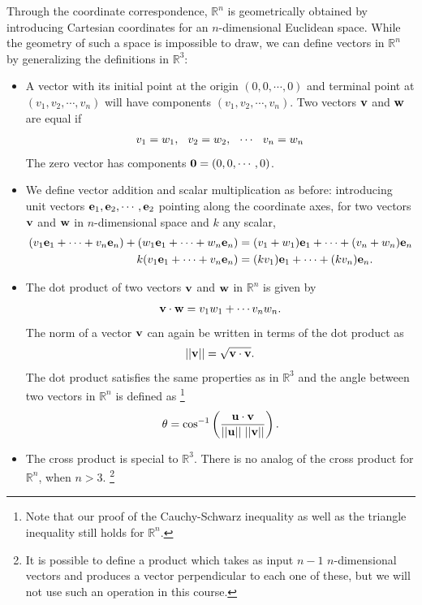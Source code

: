 \documentclass[12pt,letterpaper,reqno]{article}
\numberwithin{equation}{section}
\begin{document}
Through the coordinate correspondence, $\mathbb{R}^n$ is geometrically obtained by introducing Cartesian coordinates for an $n$-dimensional Euclidean space. While the geometry of such a space is impossible to draw, we can define vectors in $\mathbb{R}^n$ by generalizing the definitions in $\mathbb{R}^3$:
\begin{itemize}
	\item A vector with its initial point at the origin $(0,0,\cdots,0)$ and terminal point at $(v_1,v_2,\cdots,v_n)$ will have components $(v_1,v_2,\cdots,v_n)$. Two vectors ${\bf v}$ and ${\bf w}$ are equal if 
	\begin{align*}
		v_1=w_1, \hspace{0.25cm} v_2=w_2, \hspace{0.25cm} \cdots \hspace{0.25cm} v_n=w_n
	\end{align*}
	The zero vector has components ${\bf 0}=(0,0,\cdots,0)$.
	\item We define vector addition and scalar multiplication as before: introducing unit vectors ${\bf e}_1, {\bf e}_2, \cdots, {\bf e}_2$ pointing along the coordinate axes, for two vectors ${\bf v}$ and ${\bf w}$ in $n$-dimensional space and $k$ any scalar,
\begin{align*}
	(v_1{\bf e}_1+\cdots+v_n{\bf e}_n)+(w_1{\bf e}_1+\cdots+w_n{\bf e}_n)&=(v_1+w_1){\bf e}_1+\cdots +(v_n+w_n){\bf e}_n \\
	k(v_1{\bf e}_1+\cdots+v_n{\bf e}_n)&=(kv_1){\bf e}_1+\cdots+(kv_n){\bf e}_n.
\end{align*}
\item The dot product of two vectors ${\bf v}$ and ${\bf w}$ in $\mathbb{R}^n$ is given by
\begin{align*}
	{\bf v}\cdot {\bf w}=v_1w_1+\cdots v_nw_n.
\end{align*}
The norm of a vector ${\bf v}$ can again be written in terms of the dot product as 
\begin{align*}
	||{\bf v}||=\sqrt{{\bf v}\cdot {\bf v}}.
\end{align*}
The dot product satisfies the same properties as in $\mathbb{R}^3$ and the angle between two vectors in $\mathbb{R}^n$ is defined as \footnote{Note that our proof of the Cauchy-Schwarz inequality as well as the triangle inequality still holds for $\mathbb{R}^n$.}
\begin{align*}
	\theta = \cos^{-1}\left(\frac{{\bf u}\cdot {\bf v}}{||{\bf u}|| \ ||{\bf v}||}\right).
\end{align*}
\item The cross product is special to $\mathbb{R}^3$. There is no analog of the cross product for $\mathbb{R}^n$, when $n>3$. \footnote{It is possible to define a product which takes as input $n-1$ $n$-dimensional vectors and produces a vector perpendicular to each one of these, but we will not use such an operation in this course.}
\end{itemize}
\end{document}
